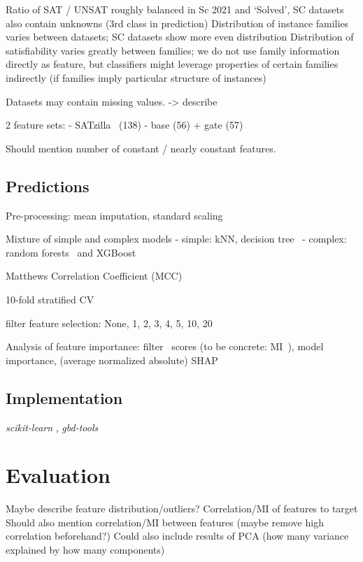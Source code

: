 \documentclass{article}
\begin{document}
Ratio of SAT / UNSAT roughly balanced in Sc 2021 and `Solved', SC datasets also contain unknowns (3rd class in prediction)
Distribution of instance families varies between datasets; SC datasets show more even distribution
Distribution of satisfiability varies greatly between families; we do not use family information directly as feature, but classifiers might leverage properties of certain families indirectly (if families imply particular structure of instances)

Datasets may contain missing values. -> describe

2 feature sets:
- SATzilla~\cite{xu2012features} (138)
- base (56) + gate (57)

Should mention number of constant / nearly constant features.

\subsection{Predictions}

Pre-processing: mean imputation, standard scaling

Mixture of simple and complex models
- simple: kNN, decision tree~\cite{breiman1984classification}
- complex: random forests~\cite{breiman2001random} and XGBoost~\cite{chen2016xgboost}

Matthews Correlation Coefficient (MCC)~\cite{matthews1975comparison, gorodkin2004comparing}

10-fold stratified CV

filter feature selection: None, 1, 2, 3, 4, 5, 10, 20

Analysis of feature importance: filter~\cite{guyon2003introduction} scores (to be concrete: MI~\cite{kraskov2004estimating}), model importance, (average normalized absolute) SHAP~\cite{lundberg2017unified}

\subsection{Implementation}

\emph{scikit-learn} \cite{pedregosa2011scikit}, \emph{gbd-tools}~\cite{iser2021collaborative}

\section{Evaluation}
\label{sec:evaluation}

Maybe describe feature distribution/outliers?
Correlation/MI of features to target
Should also mention correlation/MI between features (maybe remove high correlation beforehand?)
Could also include results of PCA (how many variance explained by how many components)
\end{document}
